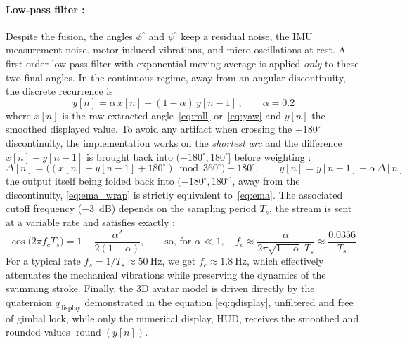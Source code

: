 \documentclass{tropLaClasse}
\begin{document}
\paragraph{Low-pass filter :} Despite the fusion, the angles $\phi^{\circ}$ and $\psi^{\circ}$ keep a residual noise, the IMU measurement noise, motor-induced vibrations, and micro-oscillations at rest. A first-order low-pass filter with exponential moving average is applied \emph{only} to these two final angles. In the continuous regime, away from an angular discontinuity, the discrete recurrence is
\begin{equation}
\boxed{\,y[n]=\alpha\,x[n]+(1-\alpha)\,y[n-1]\,},\qquad \alpha=0{.}2
\label{eq:ema}
\end{equation}
where $x[n]$ is the raw extracted angle~\eqref{eq:roll} or~\eqref{eq:yaw} and $y[n]$ the smoothed displayed value. To avoid any artifact when crossing the $\pm180^\circ$ discontinuity, the implementation works on the \emph{shortest arc} and the difference $x[n]-y[n-1]$ is brought back into $(-180^\circ,180^\circ]$ before weighting :
\begin{equation}
\Delta[n]=\big((x[n]-y[n-1]+180^\circ)\bmod 360^\circ\big)-180^\circ,
\qquad
y[n]=y[n-1]+\alpha\,\Delta[n]
\label{eq:ema_wrap}
\end{equation}
the output itself being folded back into $(-180^\circ,180^\circ]$, away from the discontinuity, \eqref{eq:ema_wrap} is strictly equivalent to~\eqref{eq:ema}. The associated cutoff frequency ($-3$~dB) depends on the sampling period $T_s$, the stream is sent at a variable rate and satisfies exactly :
\begin{equation}
\cos\!\big(2\pi f_c T_s\big)=1-\frac{\alpha^{2}}{2(1-\alpha)},
\qquad\text{so, for }\alpha\ll1,\quad
f_c\approx\frac{\alpha}{2\pi\sqrt{1-\alpha}\;T_s}\approx\frac{0{.}0356}{T_s}
\end{equation}
For a typical rate $f_s=1/T_s\approx50~\mathrm{Hz}$, we get $f_c\approx1{.}8~\mathrm{Hz}$, which effectively attenuates the mechanical vibrations while preserving the dynamics of the swimming stroke. Finally, the 3D avatar model is driven directly by the quaternion $q_{\text{display}}$ demonstrated in the equation \eqref{eq:qdisplay}, unfiltered and free of gimbal lock, while only the numerical display, HUD, receives the smoothed and rounded values $\operatorname{round}(y[n])$.
\end{document}
